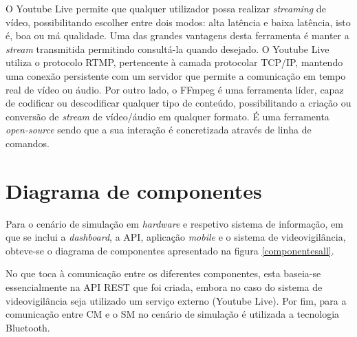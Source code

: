  O Youtube Live permite que qualquer utilizador possa realizar \textit{streaming} de vídeo, possibilitando escolher entre dois modos: alta latência e baixa latência, isto é, boa ou má qualidade. Uma das grandes vantagens desta ferramenta é manter a \textit{stream} transmitida permitindo consultá-la quando desejado. O Youtube Live utiliza o protocolo \ac{RTMP}, pertencente à camada protocolar TCP/IP, mantendo uma conexão persistente com um servidor que permite a comunicação em tempo real de vídeo ou áudio. Por outro lado, o FFmpeg é uma ferramenta líder, capaz de codificar ou descodificar qualquer tipo de conteúdo, possibilitando a criação ou conversão de \textit{stream} de vídeo/áudio em qualquer formato. É uma ferramenta \textit{open-source} sendo que a sua interação é concretizada através de linha de comandos\cite{FFmpeg2015}. 



\section{Diagrama de componentes}

Para o cenário de simulação em \textit{hardware} e respetivo sistema de informação, em que se inclui a \textit{dashboard}, a \ac{API}, aplicação \textit{mobile} e o sistema de videovigilância, obteve-se o diagrama de componentes apresentado na figura \ref{componentesall}. 

No que toca à comunicação entre os diferentes componentes, esta baseia-se essencialmente na API REST que foi criada, embora no caso do sistema de videovigilância seja utilizado um serviço externo (Youtube Live). Por fim, para a comunicação entre \acl{CM} e o \acl{SM} no cenário de simulação é utilizada a tecnologia Bluetooth. 

\newpage

